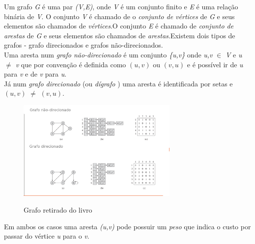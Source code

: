 \documentclass[a4paper,10pt]{article}
\begin{document}
      Um grafo \textit{G} é uma par \textit{(V,E)}, onde \textit{V} é um conjunto finito e \textit{E} é uma relação binária de \textit{V}.
      O conjunto \textit{V} é chamado de o \textit{conjunto de vértices} de \textit{G} e seus elementos são chamados 
      de \textit{vértices}.O conjunto \textit{E} é chamado de \textit{conjunto de arestas} de \textit{G} e seus elementos
      são chamados de \textit{arestas}.Existem dois tipos de grafos - grafo direcionados e grafos não-direcionados.
            \cite{bfs}\\
      
      Uma aresta num \textit{grafo não-direcionado} é um conjunto \textit{\{u,v\}} onde \textit{u,v} $\in$ \textit{V} e \textit{u $\neq$ v} que por
      convenção é definida como \textit{$(u,v)$} ou \textit{$(v,u)$} e é possível ir de \textit{u} para \textit{v} e de \textit{v} 
      para \textit{u}.\\
      
      Já num \textit{grafo direcionado} (ou \textit{dígrafo} ) uma aresta é identificada por setas e \textit{$(u,v)$} \textit{$\neq$} \textit{$(v,u)$}.
      
     \begin{figure}[H]
	\centering
      	\includegraphics[width=0.7\textwidth]{./imgs/grafo.png}\\[1cm]
      	\caption{Grafo retirado do livro \cite{bfs}}
      \end{figure}
      Em ambos os casos uma aresta \textit{(u,v)} pode possuir um \textit{peso} que indica o custo por passar do vértice \textit{u}
      para o \textit{v}.\\
      
\end{document}

